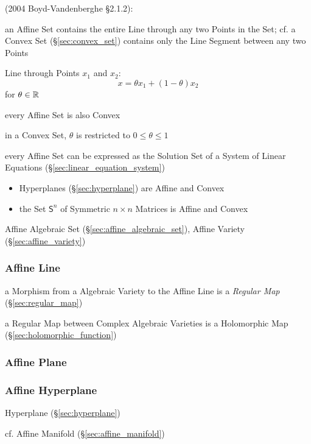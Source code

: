 (2004 Boyd-Vandenberghe \S2.1.2):

an Affine Set contains the entire Line through any two Points in the Set; cf. a
Convex Set (\S\ref{sec:convex_set}) contains only the Line Segment between any
two Points

Line through Points $x_1$ and $x_2$:
\[
  x = \theta x_1 + (1-\theta) x_2
\]
for $\theta \in \mathbb{R}$

every Affine Set is also Convex

\fist in a Convex Set, $\theta$ is restricted to $0 \leq \theta \leq 1$

every Affine Set can be expressed as the Solution Set of a System of Linear
Equations (\S\ref{sec:linear_equation_system})

\begin{itemize}
  \item Hyperplanes (\S\ref{sec:hyperplane}) are Affine and Convex
  \item the Set $\mathsf{S}^n$ of Symmetric $n \times n$ Matrices is Affine and
    Convex
\end{itemize}

\fist Affine Algebraic Set (\S\ref{sec:affine_algebraic_set}), Affine Variety
(\S\ref{sec:affine_variety})



\subsubsection{Affine Line}\label{sec:affine_line}

a Morphism from a Algebraic Variety to the Affine Line is a \emph{Regular Map}
(\S\ref{sec:regular_map})

a Regular Map between Complex Algebraic Varieties is a Holomorphic Map
(\S\ref{sec:holomorphic_function})



\subsubsection{Affine Plane}\label{sec:affine_plane}

\subsubsection{Affine Hyperplane}\label{sec:affine_hyperplane}

Hyperplane (\S\ref{sec:hyperplane})

cf. Affine Manifold (\S\ref{sec:affine_manifold})




